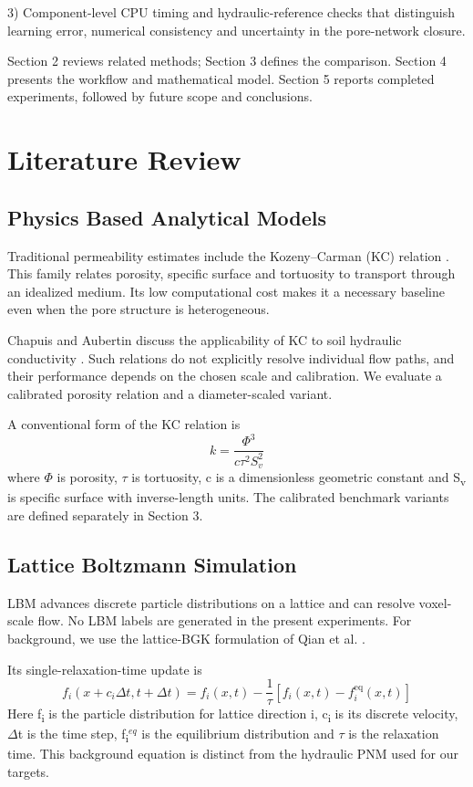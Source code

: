 \documentclass[a4paper]{svproc}
\begin{document}
3) Component-level CPU timing and hydraulic-reference checks that distinguish learning error, numerical consistency and uncertainty in the pore-network closure.

Section 2 reviews related methods; Section 3 defines the comparison. Section 4 presents the workflow and mathematical model. Section 5 reports completed experiments, followed by future scope and conclusions.

\section{Literature Review}

\subsection{Physics Based Analytical Models}

Traditional permeability estimates include the Kozeny--Carman (KC) relation \cite{r5}. This family relates porosity, specific surface and tortuosity to transport through an idealized medium. Its low computational cost makes it a necessary baseline even when the pore structure is heterogeneous.

Chapuis and Aubertin discuss the applicability of KC to soil hydraulic conductivity \cite{r5}. Such relations do not explicitly resolve individual flow paths, and their performance depends on the chosen scale and calibration. We evaluate a calibrated porosity relation and a diameter-scaled variant.

A conventional form of the KC relation is
\[
k=\frac{{\Phi }^{3}}{c{\tau }^{2}{S}_{v}^{2}}
\]
where \ensuremath{\Phi} is porosity, \ensuremath{\tau} is tortuosity, c is a dimensionless geometric constant and S\textsubscript{v} is specific surface with inverse-length units. The calibrated benchmark variants are defined separately in Section 3.

\subsection{Lattice Boltzmann Simulation}

LBM advances discrete particle distributions on a lattice and can resolve voxel-scale flow. No LBM labels are generated in the present experiments. For background, we use the lattice-BGK formulation of Qian et al. \cite{r6}.

Its single-relaxation-time update is
\[
{f}_{i}\left( x+{c}_{i}\Delta t,t+\Delta t\right)={f}_{i}\left( x,t\right)-\frac{1}{\tau }\left[ {f}_{i}\left( x,t\right)-{f}_{i}^{\mathrm{eq}}\left( x,t\right)\right]
\]
Here f\textsubscript{i} is the particle distribution for lattice direction i, c\textsubscript{i} is its discrete velocity, \ensuremath{\Delta}t is the time step, f\textsubscript{i}\ensuremath{^{eq}} is the equilibrium distribution and \ensuremath{\tau} is the relaxation time. This background equation is distinct from the hydraulic PNM used for our targets.
\end{document}
